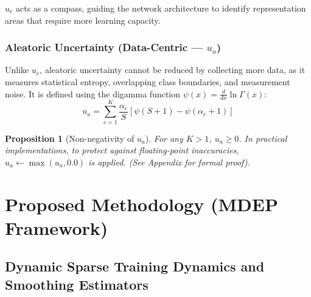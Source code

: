 \documentclass[letterpaper]{article} %
\newtheorem{proposition}{Proposition}
\begin{document}
$u_e$ acts as a compass, guiding the network architecture to identify representation areas that require more learning capacity.

\subsubsection{Aleatoric Uncertainty (Data-Centric --- $u_a$)}

Unlike $u_e$, aleatoric uncertainty cannot be reduced by collecting more data, as it measures statistical entropy, overlapping class boundaries, and measurement noise. It is defined using the digamma function $\psi(x) = \frac{d}{dx} \ln \Gamma(x)$:
\begin{equation}\label{eq:u_a}
    u_a = \sum_{c=1}^K \frac{\alpha_c}{S} \left[\psi(S + 1) - \psi(\alpha_c + 1)\right]
\end{equation}

\begin{proposition}[Non-negativity of $u_a$]
For any $K > 1$, $u_a \ge 0$. In practical implementations, to protect against floating-point inaccuracies, $u_a \leftarrow \max(u_a, 0.0)$ is applied. (See Appendix for formal proof).
\end{proposition}

\section{Proposed Methodology (MDEP Framework)}\label{sec:methodology}

\subsection{Dynamic Sparse Training Dynamics and Smoothing Estimators}
\end{document}
